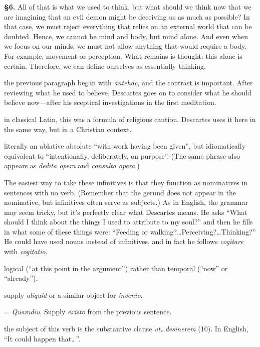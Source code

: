 \prenotes

\textbf{§6.} All of that is what we used to think, but what should we think now that we are imagining that an evil demon might be deceiving us as much as possible? In that case, we must reject everything that relies on an external world that can be doubted. Hence, we cannot be mind and body, but mind alone. And even when we focus on our minds, we must not allow anything that would require a body. For example, movement or perception. What remains is thought: this alone is certain. Therefore, we can define ourselves as essentially thinking.

 the previous paragraph began with \textit{antehac}, and the contrast is important. After reviewing what he used to believe, Descartes goes on to consider what he should believe now---after his sceptical investigations in the first meditation.

 in classical Latin, this was a formula of religious caution. Descartes uses it here in the same way, but in a Christian context.

 literally an ablative absolute ``with work having been given'', but idiomatically equivalent to ``intentionally, deliberately, on purpose''. (The same phrase also appears as \textit{dedita opera} and \textit{consulta opera}.)

 The easiest way to take these infinitives is that they function as nominatives in sentences with no verb. (Remember that the gerund does not appear in the nominative, but infinitives often serve as subjects.) As in English, the grammar may seem tricky, but it's perfectly clear what Descartes means. He asks ``What should I think about the things I used to attribute to my soul?'' and then he fills in what some of these things were: ``Feeding or walking?\dots Perceiving?\dots Thinking?'' He could have used nouns instead of infinitives, and in fact he follows \textit{cogitare} with \textit{cogitatio}.

 logical (``at this point in the argument'') rather than temporal (``now'' or ``already'').

 supply \textit{aliquid} or a similar object for \textit{invenio}.

 = \textit{Quamdiu}. Supply \textit{existo} from the previous sentence.

 the subject of this verb is the substantive clause \textit{ut\dots desinerem} (10). In English, ``It could happen that\dots''.

